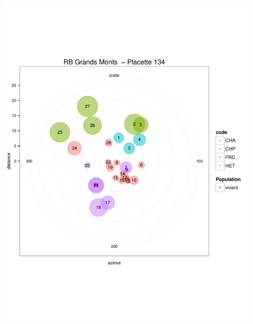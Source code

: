 \documentclass[a4paper]{book}\usepackage[]{graphicx}\usepackage[]{color}
\makeatletter
\def\maxwidth{ %
  \ifdim\Gin@nat@width>\linewidth
    \linewidth
  \else
    \Gin@nat@width
  \fi
}
\newenvironment{knitrout}{}{} %
\makeatother
\begin{document}
\begin{knitrout}
{\centering \includegraphics[width=\maxwidth]{Figures/PlanArbres-8} 

}





\end{knitrout}
\end{document}

